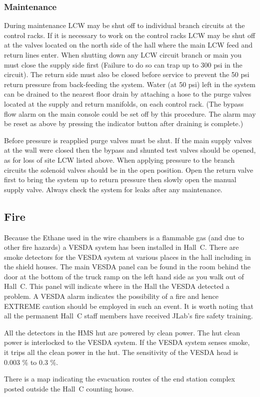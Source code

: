 {\subsubsection{Maintenance}

During maintenance LCW may be shut off to individual branch circuits at
the control racks.  If it is necessary to work on the control racks LCW
may be shut off at the valves located on the north side of the hall
where the main LCW feed and return lines enter.  When shutting down any
LCW circuit branch or main you must close the supply side first (Failure
to do so can trap up to 300 psi in the circuit).  The return side must
also be closed before service to prevent the 50 psi return pressure from
back-feeding the system.  Water (at 50 psi) left in the system can be
drained to the nearest floor drain by attaching a hose to the purge
valves located at the supply and return manifolds, on each control rack.
(The bypass flow alarm on the main console could be set off by this
procedure.  The alarm may be reset as above by pressing the indicator
button after draining is complete.)

Before pressure is reapplied purge valves must be shut.  If the main
supply valves at the wall were closed then the bypass and shunted test
valves should be opened, as for loss of site LCW listed above.  When
applying pressure to the branch circuits the solenoid valves should be
in the open position.  Open the return valve first to bring the system
up to return pressure then slowly open the manual supply valve.  Always
check the system for leaks after any maintenance.


\subsection{Fire}

Because the Ethane used in the wire chambers is a flammable gas
(and due to other fire hazards) a VESDA
system has been installed in Hall~C. There are smoke detectors
for the VESDA system at various places in the hall including in the shield
houses.
The main VESDA panel can be found in the room behind the door at the bottom
of the truck ramp on the left hand side as you walk out of Hall~C. This
panel will indicate where in the Hall the VESDA detected a problem.
A VESDA alarm indicates the possibility of a fire and hence EXTREME caution
should be employed in such an event. It is worth noting that all the
permanent Hall~C staff members have received JLab's fire safety training.

All the detectors in the HMS hut are powered by clean power. The
hut clean power is interlocked to the VESDA system. If the VESDA system
senses smoke, it trips all the clean power in the hut. The sensitivity of the
VESDA head is 0.003 \% to 0.3 \%.

There is a map indicating the evacuation routes of the end station complex
posted outside the Hall~C counting house.

}
